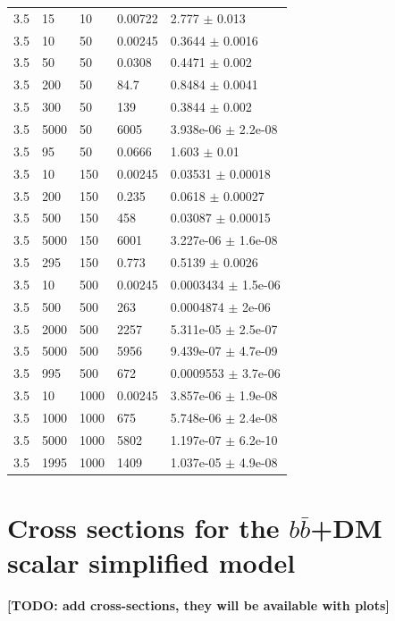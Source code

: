\begin{longtable}{lllll}
	3.5 & 15 & 10 & 0.00722 & 2.777 $\pm$ 0.013 \\
	3.5 & 10 & 50 & 0.00245 & 0.3644 $\pm$ 0.0016 \\
	3.5 & 50 & 50 & 0.0308 & 0.4471 $\pm$ 0.002 \\
	3.5 & 200 & 50 & 84.7 & 0.8484 $\pm$ 0.0041 \\
	3.5 & 300 & 50 & 139 & 0.3844 $\pm$ 0.002 \\
	3.5 & 5000 & 50 & 6005 & 3.938e-06 $\pm$ 2.2e-08 \\
	3.5 & 95 & 50 & 0.0666 & 1.603 $\pm$ 0.01 \\
	3.5 & 10 & 150 & 0.00245 & 0.03531 $\pm$ 0.00018 \\
	3.5 & 200 & 150 & 0.235 & 0.0618 $\pm$ 0.00027 \\
	3.5 & 500 & 150 & 458 & 0.03087 $\pm$ 0.00015 \\
	3.5 & 5000 & 150 & 6001 & 3.227e-06 $\pm$ 1.6e-08 \\
	3.5 & 295 & 150 & 0.773 & 0.5139 $\pm$ 0.0026 \\
	3.5 & 10 & 500 & 0.00245 & 0.0003434 $\pm$ 1.5e-06 \\
	3.5 & 500 & 500 & 263 & 0.0004874 $\pm$ 2e-06 \\
	3.5 & 2000 & 500 & 2257 & 5.311e-05 $\pm$ 2.5e-07 \\
	3.5 & 5000 & 500 & 5956 & 9.439e-07 $\pm$ 4.7e-09 \\
	3.5 & 995 & 500 & 672 & 0.0009553 $\pm$ 3.7e-06 \\
	3.5 & 10 & 1000 & 0.00245 & 3.857e-06 $\pm$ 1.9e-08 \\
	3.5 & 1000 & 1000 & 675 & 5.748e-06 $\pm$ 2.4e-08 \\
	3.5 & 5000 & 1000 & 5802 & 1.197e-07 $\pm$ 6.2e-10 \\
	3.5 & 1995 & 1000 & 1409 & 1.037e-05 $\pm$ 4.9e-08 \\
\end{longtable}

\section{Cross sections for the $b\bar b$+DM scalar simplified model}

\textbf{[TODO: add cross-sections, they will be available with plots]}

